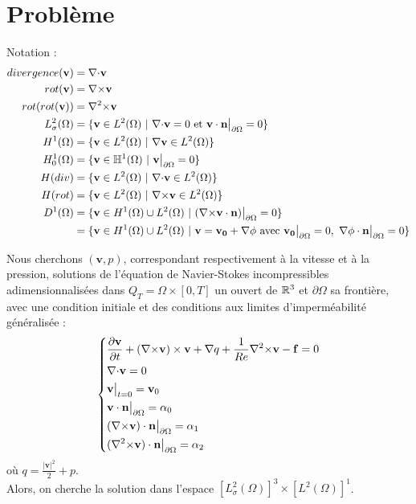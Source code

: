 \chapter{Problème}

Notation :
\begin{align*}
divergence(\mathbf{v})&=\diverg \mathbf{v}\\
rot(\mathbf{v})&=\rot \mathbf{v}\\
rot(rot(\mathbf{v}))&=\rott \mathbf{v}\\
L^2_\sigma(\Omega) &= \{\mathbf{v} \in L^2(\Omega)\ |\ \diverg \mathbf{v} = 0\text{ et }\mathbf{v}\cdot \mathbf{n}\restr = 0 \}\\
H^1(\Omega) &= \{\mathbf{v} \in L^2(\Omega)\ |\ \grad \mathbf{v}\in L^2(\Omega)\}\\
H^1_0(\Omega) &= \{\mathbf{v} \in \HH^1(\Omega)\ |\ \mathbf{v}\restr = 0\}\\
H(div) &= \{\mathbf{v} \in L^2(\Omega)\ |\ \diverg\mathbf{v} \in L^2(\Omega) \}\\
H(rot) &= \{\mathbf{v} \in L^2(\Omega)\ |\ \rot\mathbf{v} \in L^2(\Omega) \}\\
D^1(\Omega) &= \{\mathbf{v} \in H^1(\Omega)\cup L^2(\Omega)\ |\ (\rot \mathbf{v}\cdot \mathbf{n})\restr = 0  \}\\
&=\{\mathbf{v} \in H^1(\Omega)\cup L^2(\Omega)\ |\ \mathbf{v}=\mathbf{v_0}+\grad\phi \text{ avec } \mathbf{v_0}\restr = 0,\ \grad\phi\cdot \mathbf{n}\restr = 0 \}
\end{align*}

Nous cherchons $(\mathbf{v},p)$, correspondant respectivement à la vitesse et à la pression, solutions de l'équation de Navier-Stokes incompressibles adimensionnalisées dans $Q_T=\Omega\times[0,T]$ un ouvert de ${\mathbb{R}}^3$ et $\partial\Omega$ sa frontière, avec une condition initiale et des conditions aux limites d'imperméabilité généralisée :
\begin{equation}
\label{depart}
\left\{
\begin{aligned}
&\frac{\partial \mathbf{v}}{\partial t} + ({\nabla\times}  \mathbf{v})\times \mathbf{v} + {\nabla} q + \frac{1}{Re}{\nabla^2\times}  \mathbf{v}-\mathbf{f} = 0\\
&{\nabla\cdot} \mathbf{v} = 0\\
&\mathbf{v}\big\rvert_{t=0} = \mathbf{v}_0\\
&\mathbf{v}\cdot \mathbf{n}{\big\rvert_{\partial\Omega}} = \alpha_0\\
&({\nabla\times}  \mathbf{v})\cdot \mathbf{n}{\big\rvert_{\partial\Omega}} = \alpha_1\\
&({\nabla^2\times}  \mathbf{v})\cdot \mathbf{n}{\big\rvert_{\partial\Omega}} = \alpha_2
\end{aligned}
\right.
\end{equation}
où $q = \frac{|\mathbf{v}|^2}{2}+p$.\\
Alors, on cherche la solution dans l'espace $[L^2_\sigma(\Omega)]^3\times [L^2(\Omega)]^1$.\\

